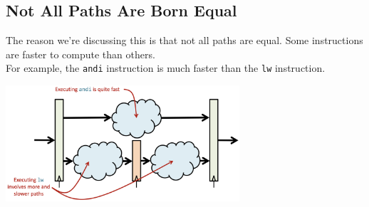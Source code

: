 \subsection{Not All Paths Are Born Equal}
The reason we're discussing this is that not all paths are equal. Some instructions are faster to compute than others. \\
For example, the \texttt{andi} instruction is much faster than the \texttt{lw} instruction. \\
\begin{center}
    \includegraphics[width=0.65\textwidth]{chapters/chapter2a/images/paths.png}
\end{center}

